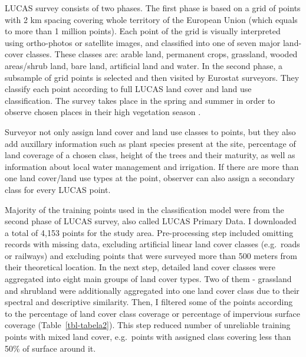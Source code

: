 \documentclass{amuthesis}
\begin{document}
LUCAS survey consists of two phases. The first phase is based on a grid
of points with 2 km spacing covering whole territory of the European
Union (which equals to more than 1 million points). Each point of the
grid is visually interpreted using ortho-photos or satellite images, and
classified into one of seven major land-cover classes. These classes
are: arable land, permanent crops, grassland, wooded areas/shrub land,
bare land, artificial land and water. In the second phase, a subsample
of grid points is selected and then visited by Eurostat surveyors. They
classify each point according to full LUCAS land cover and land use
classification. The survey takes place in the spring and summer in order
to observe chosen places in their high vegetation season
\autocite{dandrimont_harmonised_2020}.

Surveyor not only assign land cover and land use classes to points, but
they also add auxillary information such as plant species present at the
site, percentage of land coverage of a chosen class, height of the trees
and their maturity, as well as information about local water management
and irrigation. If there are more than one land cover/land use types at
the point, observer can also assign a secondary class for every LUCAS
point.

Majority of the training points used in the classification model were
from the second phase of LUCAS survey, also called LUCAS Primary Data. I
downloaded a total of 4,153 points for the study area. Pre-processing
step included omitting records with missing data, excluding artificial
linear land cover classes (e.g.~roads or railways) and excluding points
that were surveyed more than 500 meters from their theoretical location.
In the next step, detailed land cover classes were aggregated into eight
main groups of land cover types. Two of them - grassland and shrubland
were additionally aggregated into one land cover class due to their
spectral and descriptive similarity. Then, I filtered some of the points
according to the percentage of land cover class coverage or percentage
of impervious surface coverage (Table~\ref{tbl-tabela2}). This step
reduced number of unreliable training points with mixed land cover,
e.g.~points with assigned class covering less than 50\% of surface
around it.
\end{document}
